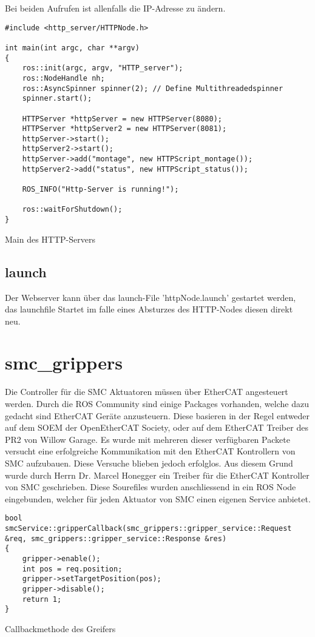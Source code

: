 Bei beiden Aufrufen ist allenfalls die IP-Adresse zu ändern.

\begin{code}
	\begin{verbatim}
#include <http_server/HTTPNode.h>

int main(int argc, char **argv)
{
    ros::init(argc, argv, "HTTP_server");
    ros::NodeHandle nh;
    ros::AsyncSpinner spinner(2); // Define Multithreadedspinner
    spinner.start();

    HTTPServer *httpServer = new HTTPServer(8080);
    HTTPServer *httpServer2 = new HTTPServer(8081);
    httpServer->start();
    httpServer2->start();
    httpServer->add("montage", new HTTPScript_montage());
    httpServer2->add("status", new HTTPScript_status());

    ROS_INFO("Http-Server is running!");

    ros::waitForShutdown();
}
	\end{verbatim}
\vspace{-10pt}
\caption{Main des HTTP-Servers}
\label{code:httpMain}
\end{code}
\subsection{launch}
Der Webserver kann über das launch-File 'httpNode.launch' gestartet werden, das launchfile Startet im falle eines Absturzes des HTTP-Nodes diesen direkt neu.

\section{smc\_grippers}
Die Controller für die SMC Aktuatoren müssen über EtherCAT angesteuert werden. Durch die ROS Community sind einige Packages vorhanden, welche dazu gedacht sind EtherCAT Geräte anzusteuern. Diese basieren in der Regel entweder auf dem \gls{SOEM} der OpenEtherCAT Society, oder auf dem EtherCAT Treiber des PR2 von Willow Garage. Es wurde mit mehreren dieser verfügbaren Packete versucht eine erfolgreiche Kommunikation mit den EtherCAT Kontrollern von SMC aufzubauen. Diese Versuche blieben jedoch erfolglos. Aus diesem Grund wurde durch Herrn Dr. Marcel Honegger ein Treiber für die EtherCAT Kontroller von SMC geschrieben. Diese Sourefiles wurden anschliessend in ein ROS Node eingebunden, welcher für jeden Aktuator von SMC einen eigenen Service anbietet.\\
\begin{code}
	\begin{verbatim}
bool smcService::gripperCallback(smc_grippers::gripper_service::Request &req, smc_grippers::gripper_service::Response &res)
{
    gripper->enable();
    int pos = req.position;
    gripper->setTargetPosition(pos);
    gripper->disable();
    return 1;
}
	\end{verbatim}
\vspace{-10pt}
\caption{Callbackmethode des Greifers}
\label{code:CallbackGripper}
\end{code}

